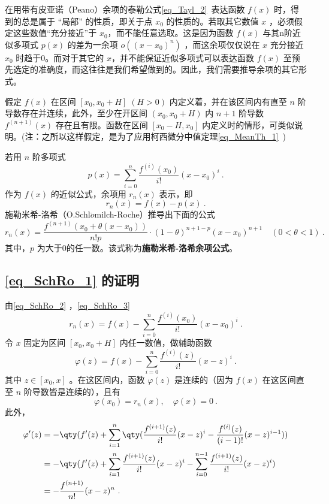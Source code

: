 
在用带有皮亚诺（Peano）余项的泰勒公式\autoref{eq_Tayl_2}~表达函数 $f(x)$ 时，得到的总是属于 “局部” 的性质，即关于点 $x_0$ 的性质的。若取其它数值 $x$ ，必须假定这些数值“充分接近”于 $x_0$，而不能任意选取。这是因为函数 $f(x)$ 与其n阶近似多项式 $p(x)$ 的差为一余项 $o((x-x_0)^n)$ ，而这余项仅仅说在 $x$ 充分接近 $x_0$ 时趋于0。而对于其它的 $x$，并不能保证近似多项式可以表达函数 $f(x)$ 至预先选定的准确度，而这往往是我们希望做到的。因此，我们需要推导余项的其它形式。

假定 $f(x)$ 在区间 $[x_0,x_0+H]\;(H>0)$ 内定义着，并在该区间内有直至 $n$ 阶导数存在并连续，此外，至少在开区间 $(x_0,x_0+H)$ 内 $n+1$ 阶导数 $f^{(n+1)}(x)$ 存在且有限。函数在区间 $[x_0-H,x_0]$ 内定义时的情形，可类似说明。(注：之所以这样假定，是为了应用柯西微分中值定理\autoref{eq_MeanTh_1}~)

若用 $n$ 阶多项式
\begin{equation}\label{eq_SchRo_2}
p(x)=\sum_{i=0}^n\frac{f^{(i)}(x_0)}{i!}(x-x_0)^i~.
\end{equation}
作为 $f(x)$ 的近似公式，余项用 $r_n(x)$ 表示，即 
\begin{equation}\label{eq_SchRo_3}
r_n(x)=f(x)-p(x)~.
\end{equation}
施勒米希-洛希（O.Schl$\ddot{o}$milch-Roche）推导出下面的公式
\begin{equation}\label{eq_SchRo_1}
r_n(x)=\frac{f^{(n+1)}(x_0+\theta(x-x_0))}{n!p}\cdot(1-\theta)^{n+1-p}(x-x_0)^{n+1}\quad (0<\theta<1)~.
\end{equation}
其中，$p$ 为大于0的任一数。该式称为\textbf{施勒米希-洛希余项公式}。
\subsection{\autoref{eq_SchRo_1} 的证明}
由\autoref{eq_SchRo_2} ，\autoref{eq_SchRo_3} 
\begin{equation}
r_n(x)=f(x)-\sum_{i=0}^n\frac{f^{(i)}(x_0)}{i!}(x-x_0)^i~.
\end{equation}
令 $x$ 固定为区间 $[x_0,x_0+H]$ 内任一数值，做辅助函数
\begin{equation}
\varphi(z)=f(x)-\sum_{i=0}^n\frac{f^{(i)}(z)}{i!}(x-z)^i~.
\end{equation}
其中 $z\in[x_0,x]$ 。在这区间内，函数 $\varphi(z)$ 是连续的（因为 $f(x)$ 在这区间直至 $n$ 阶导数皆是连续的），且有
\begin{equation}\label{eq_SchRo_4}
\varphi(x_0)=r_n(x),\quad \varphi(x)=0~.
\end{equation}
此外，
\begin{equation}\label{eq_SchRo_6}
\begin{aligned}
\varphi'(z)&=-\qty(f'(z)+\sum_{i=1}^n\qty(\frac{f^{(i+1)}(z)}{i!}(x-z)^i-\frac{f^{(i)}(z)}{(i-1)!}(x-z)^{i-1}))\\
&=-\qty(f'(z)+\sum_{i=1}^n\frac{f^{(i+1)}(z)}{i!}(x-z)^i-\sum_{i=0}^{n-1}\frac{f^{(i+1)}(z)}{i!}(x-z)^{i})\\
&=-\frac{f^{(n+1)}}{n!}(x-z)^{n}~.
\end{aligned}
\end{equation}

